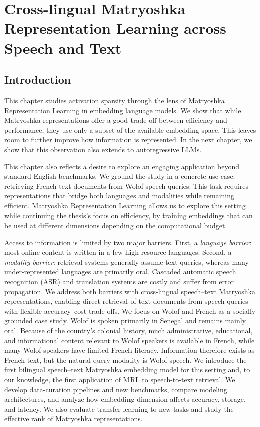 \chapter{Cross-lingual Matryoshka Representation Learning across Speech and Text}\label{ch:mrl}
\section{Introduction}
This chapter studies activation sparsity through the lens of Matryoshka Representation Learning
in embedding language models. We show that while Matryoshka representations offer a good trade-off
between efficiency and performance, they use only a subset of the available embedding space.
This leaves room to further improve how information is represented. In the next chapter, we
show that this observation also extends to autoregressive LLMs.

This chapter also reflects a desire to explore an engaging application beyond standard
English benchmarks. We ground the study in a concrete use case: retrieving French text
documents from Wolof speech queries. This task requires representations that bridge both
languages and modalities while remaining efficient. Matryoshka Representation Learning
allows us to explore this setting while continuing the thesis's focus on efficiency, by
training embeddings that can be used at different dimensions depending on the computational
budget.

Access to information is limited by two major barriers. First, a \emph{language barrier}: most online content is written in a few high-resource languages. Second, a \emph{modality barrier}: retrieval systems generally assume text queries, whereas many under-represented languages are primarily oral. Cascaded automatic speech recognition (ASR) and translation systems are costly and suffer from error propagation. We address both barriers with cross-lingual speech--text Matryoshka representations, enabling direct retrieval of text documents from speech queries with flexible accuracy--cost trade-offs.
We focus on Wolof and French as a socially grounded case study. Wolof is spoken primarily in Senegal and remains mainly oral. Because of the country's colonial history, much administrative, educational, and informational content relevant to Wolof speakers is available in French, while many Wolof speakers have limited French literacy. Information therefore exists as French text, but the natural query modality is Wolof speech.
We introduce the first bilingual speech--text Matryoshka embedding model for this setting and, to our knowledge, the first application of MRL to speech-to-text retrieval. We develop data-curation pipelines and new benchmarks, compare modeling architectures, and analyze how embedding dimension affects accuracy, storage, and latency. We also evaluate transfer learning to new tasks and study the effective rank of Matryoshka representations.

